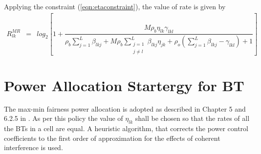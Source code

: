 \documentclass[10pt, a4paper, twoside,fleqn]{article}
\begin{document}
Applying the constraint (\ref{eqn:etaconstraint}), the value of rate is given by
\begin{eqnarray}\label{eqn:rateot}
R_{lk}^{MR} &=& log_2\left[1+\dfrac{M\rho_b\eta_{lk}\gamma_{lkl}}{ \rho_b\sum\limits_{j=1}^{L}\beta_{lkj}+M\rho_b\sum\limits_{\substack{j=1 \\ j \neq l}}^{L}\beta_{lkj}\eta_{jk} +\rho_o\left(\sum\limits_{j=1}^{L}\beta_{lkj} -\gamma_{lkl}\right)+1}\right]
\end{eqnarray}


\section{Power Allocation Startergy for BT}
The max-min fairness power allocation is adopted as described in Chapter 5 and 6.2.5 in \cite{bib:MassiveMimoBook}. As per this policy the value of $\eta_{lk}$ shall be chosen so that the rates of all the BTs in a cell are equal. A heuristic algorithm, that corrects the power control coefficients to the first order of approximation for the effects of coherent interference is used.
\end{document}
